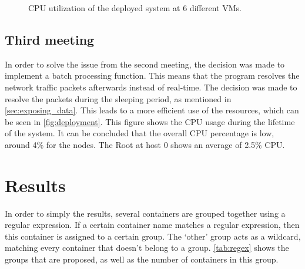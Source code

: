 \begin{figure}[H]
    \caption{CPU utilization of the deployed system at 6 different VMs.}
    \label{fig:deployment}
\end{figure}

\subsection{Third meeting}
In order to solve the issue from the second meeting, the decision was made to implement a batch processing function. This means that the program resolves the network traffic packets afterwards instead of real-time. The decision was made to resolve the packets during the sleeping period, as mentioned in \autoref{sec:exposing_data}. This leads to a more efficient use of the resources, which can be seen in \autoref{fig:deployment}. This figure shows the CPU usage during the lifetime of the system. It can be concluded that the overall  CPU percentage is low, around 4\% for the nodes. The Root at host $0$ shows an average of 2.5\% CPU.

\section{Results}\label{sec:sb-results}
In order to simply the results, several containers are grouped together using a regular expression. If a certain container name matches a regular expression, then this container is assigned to a certain group. The `other' group acts as a wildcard, matching every container that doesn't belong to a group. \autoref{tab:regex} shows the groups that are proposed, as well as the number of containers in this group.\\

